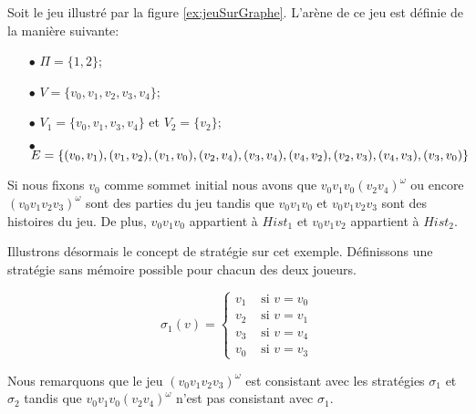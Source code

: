 \begin{exemple}
	Soit le jeu illustré par la figure \ref{ex:jeuSurGraphe}. 
	L'arène de ce jeu est définie de la manière suivante:
	\begin{itemize}
		\item[$\bullet$] $\Pi = \{ 1, 2 \}$;
		\item[$\bullet$] $ V = \{ v_0, v_1, v_2, v_3, v_4 \}$;
		\item[$\bullet$] $V_1 = \{ v_0, v_1, v_3, v_4 \}$ et $V_2 = \{ v_2 \};$
		\item[$\bullet$] $E = \{(v_0, v_1), (v_1, v_2), (v_1, v_0), (v_2, v_4), (v_3, v_4), (v_4, v_2), (v_2, v_3),\\
		 (v_4, v_3),
		 (v_3, v_0) \}$
	\end{itemize} 
	$ $\\
	Si nous fixons $v_0$ comme sommet initial nous avons que $v_0 v_1 v_0 (v_2 v_4)^{\omega}$ ou encore $(v_0 v_1 v_2 v_3)^{\omega}$ sont des parties du jeu tandis que $v_0 v_1 v_0$ et $v_0 v_1 v_2 v_3$ sont des histoires du jeu. De plus, $v_0 v_1 v_0 $ appartient à $Hist_1$ et $v_0 v_1 v_2$ appartient à $Hist_2$.
	
	Illustrons désormais le concept de stratégie sur cet exemple. Définissons une stratégie sans mémoire possible pour chacun des deux joueurs.

	
	 \begin{minipage}[c]{0.4\linewidth}$$ \sigma_1(v) = \begin{cases}
					 v_1  &\text{ si } v = v_0\\
					v_2  &\text{ si } v = v_1\\
					v_3 &\text{ si } v = v_4\\
					v_0 &\text{ si } v = v_3
				\end{cases} $$\end{minipage} \hfill
	\begin{minipage}[c]{0.1\linewidth}\end{minipage} \hfill \begin{minipage}[c]{0.30\linewidth}	 \end{minipage} \newline
	
	Nous remarquons que le jeu $(v_0 v_1 v_2 v_3)^{\omega}$ est consistant avec les stratégies $\sigma_1$ et $\sigma_2$ tandis que $v_0 v_1 v_0 (v_2 v_4)^{\omega}$ n'est pas consistant avec $\sigma_1$.
		
		
	

\end{exemple}
